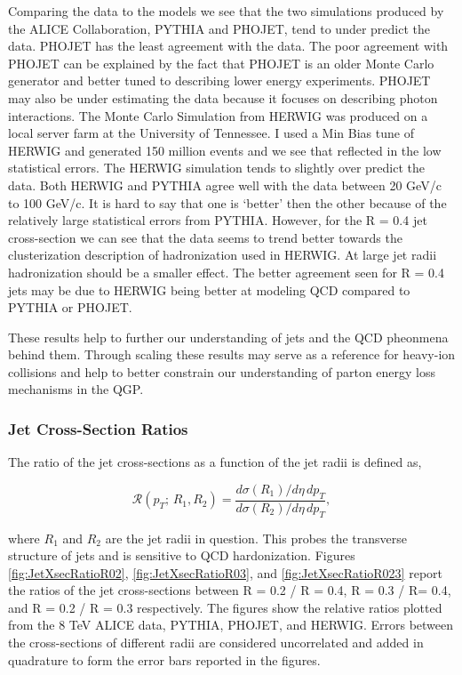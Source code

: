Comparing the data to the models we see that the two simulations produced by the ALICE Collaboration, PYTHIA and PHOJET, tend to under predict the data.  PHOJET has the least agreement with the data.  The poor agreement with PHOJET can be explained by the fact that PHOJET is an older Monte Carlo generator and better tuned to describing lower energy experiments.  PHOJET may also be under estimating the data because it focuses on describing photon interactions.  The Monte Carlo Simulation from HERWIG was produced on a local server farm at the University of Tennessee.  I used a Min Bias tune of HERWIG and generated 150 million events and we see that reflected in the low statistical errors.  The HERWIG simulation tends to slightly over predict the data.  Both HERWIG and PYTHIA agree well with the data between 20 GeV/c to 100 GeV/c.  It is hard to say that one is `better' then the other because of the relatively large statistical errors from PYTHIA.  However, for the R = 0.4 jet cross-section we can see that the data seems to trend better towards the clusterization description of hadronization used in HERWIG.  At large jet radii hadronization should be a smaller effect.  The better agreement seen for R = 0.4 jets may be due to HERWIG being better at modeling QCD compared to PYTHIA or PHOJET.

These results help to further our understanding of jets and the QCD pheonmena behind them.  Through scaling these results may serve as a reference for heavy-ion collisions and help to better constrain our understanding of parton energy loss mechanisms in the QGP.  


\subsubsection{Jet Cross-Section Ratios}


\noindent
The ratio of the jet cross-sections as a function of the jet radii is defined as,

\begin{equation}
\mathscr{R} (p_{T}; \, R_{1},R_{2}) = \frac{d\sigma(R_{1}) /d\eta \, dp_{T} }{d\sigma (R_{2}) /d\eta \, dp_{T}},
\label{eq:jetxsecratio}
\end{equation}

\noindent
where $R_{1}$ and $R_{2}$ are the jet radii in question. This probes the transverse structure of jets and is sensitive to QCD hardonization\cite{SOYEZ201159}.  Figures \ref{fig:JetXsecRatioR02}, \ref{fig:JetXsecRatioR03}, and \ref{fig:JetXsecRatioR023} report the ratios of the jet cross-sections between R = 0.2 / R = 0.4, R = 0.3 / R= 0.4, and R = 0.2 / R = 0.3 respectively.  The figures show the relative ratios plotted from the 8 TeV ALICE data, PYTHIA, PHOJET, and HERWIG.  Errors between the cross-sections of different radii are considered uncorrelated and added in quadrature to form the error bars reported in the figures.

